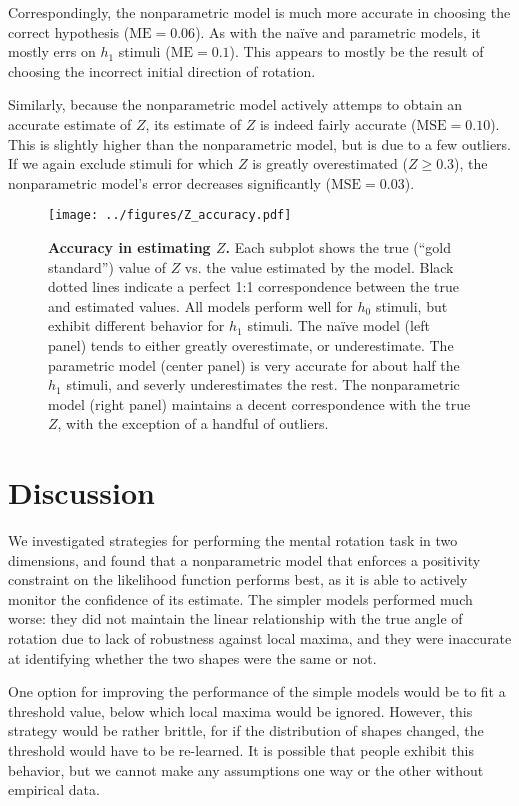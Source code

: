 \documentclass{article} %
\newcommand{\MSE}[0]{\mathrm{MSE}}
\newcommand{\ME}[0]{\mathrm{ME}}
\newcommand{\naive}[0]{na\"ive}
\begin{document}
Correspondingly, the nonparametric model is much more accurate in
choosing the correct hypothesis ($\ME{}=0.06$). As with the \naive{}
and parametric models, it mostly errs on $h_1$ stimuli
($\ME{}=0.1$). This appears to mostly be the result of choosing the
incorrect initial direction of rotation.

Similarly, because the nonparametric model actively attemps to obtain
an accurate estimate of $Z$, its estimate of $Z$ is indeed fairly
accurate ($\MSE{}=0.10$). This is slightly higher than the
nonparametric model, but is due to a few outliers. If we again exclude
stimuli for which $Z$ is greatly overestimated ($Z\geq 0.3$), the
nonparametric model's error decreases significantly ($\MSE{}=0.03$).

\begin{figure}[t]
  \centering
  \texttt{[image: ../figures/Z\_accuracy.pdf]}
  \caption{\textbf{Accuracy in estimating $Z$.} Each subplot shows the
    true (``gold standard'') value of $Z$ vs. the value estimated by
    the model. Black dotted lines indicate a perfect 1:1
    correspondence between the true and estimated values. All models
    perform well for $h_0$ stimuli, but exhibit different behavior for
    $h_1$ stimuli. The \naive{} model (left panel) tends to either
    greatly overestimate, or underestimate. The parametric model
    (center panel) is very accurate for about half the $h_1$ stimuli,
    and severly underestimates the rest. The nonparametric model
    (right panel) maintains a decent correspondence with the true $Z$,
    with the exception of a handful of outliers.}
  \label{fig:accuracy}
\end{figure}

\section{Discussion}

We investigated strategies for performing the mental rotation task
\cite{Shepard1971} in two dimensions, and found that a nonparametric
model that enforces a positivity constraint on the likelihood function
performs best, as it is able to actively monitor the confidence of its
estimate. The simpler models performed much worse: they did not
maintain the linear relationship with the true angle of rotation due
to lack of robustness against local maxima, and they were inaccurate
at identifying whether the two shapes were the same or not.

One option for improving the performance of the simple models would be
to fit a threshold value, below which local maxima would be
ignored. However, this strategy would be rather brittle, for if the
distribution of shapes changed, the threshold would have to be
re-learned. It is possible that people exhibit this behavior, but we
cannot make any assumptions one way or the other without empirical
data.
\end{document}
